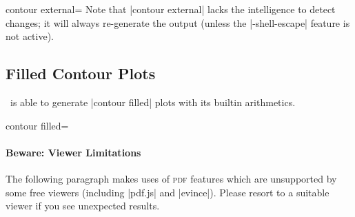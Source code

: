 {{\begin{plottype}[/pgfplots]{contour external=\textcolor{black}{}}
	Note that |contour external| lacks the intelligence to detect changes; it will always re-generate the output (unless the |-shell-escape| feature is not active).
\end{plottype}

% 
% 

}

\subsection{Filled Contour Plots}
{
\label{sec:pgfplots:filled:contour}%
%
%
\PGFPlots\ is able to generate |contour filled| plots with its builtin arithmetics. 

\begin{plottype}[/pgfplots]{contour filled=\textcolor{black}{}}
	\paragraph{Beware: Viewer Limitations} The following paragraph makes uses of \textsc{pdf} features which are unsupported by some free viewers (including |pdf.js| and |evince|). Please resort to a suitable viewer if you see unexpected results.


\end{plottype}}}
